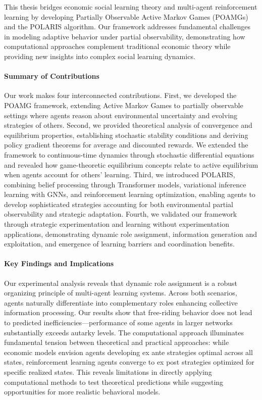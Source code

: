 This thesis bridges economic social learning theory and multi-agent reinforcement learning by developing Partially Observable Active Markov Games (POAMGs) and the POLARIS algorithm. Our framework addresses fundamental challenges in modeling adaptive behavior under partial observability, demonstrating how computational approaches complement traditional economic theory while providing new insights into complex social learning dynamics.

\paragraph{Summary of Contributions}

Our work makes four interconnected contributions. First, we developed the POAMG framework, extending Active Markov Games to partially observable settings where agents reason about environmental uncertainty and evolving strategies of others. Second, we provided theoretical analysis of convergence and equilibrium properties, establishing stochastic stability conditions and deriving policy gradient theorems for average and discounted rewards. We extended the framework to continuous-time dynamics through stochastic differential equations and revealed how game-theoretic equilibrium concepts relate to active equilibrium when agents account for others' learning. Third, we introduced POLARIS, combining belief processing through Transformer models, variational inference learning with GNNs, and reinforcement learning optimization, enabling agents to develop sophisticated strategies accounting for both environmental partial observability and strategic adaptation. Fourth, we validated our framework through strategic experimentation and learning without experimentation applications, demonstrating dynamic role assignment, information generation and exploitation, and emergence of learning barriers and coordination benefits.

\paragraph{Key Findings and Implications}

Our experimental analysis reveals that dynamic role assignment is a robust organizing principle of multi-agent learning systems. Across both scenarios, agents naturally differentiate into complementary roles enhancing collective information processing. Our results show that free-riding behavior does not lead to predicted inefficiencies—performance of some agents in larger networks substantially exceeds autarky levels. The computational approach illuminates fundamental tension between theoretical and practical approaches: while economic models envision agents developing ex ante strategies optimal across all states, reinforcement learning agents converge to ex post strategies optimized for specific realized states. This reveals limitations in directly applying computational methods to test theoretical predictions while suggesting opportunities for more realistic behavioral models.

